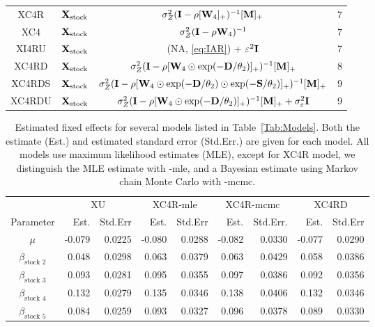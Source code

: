 \documentclass[11pt, titlepage]{article}\usepackage[]{graphicx}\usepackage[]{color}
\begin{document}
\begin{table}[ht]
\begin{center}
\begin{tabular}{c|c|c|c}
  XC4R & $\mathbf{X}_{\textrm{stock}}$ & $\sigma_Z^2(\mathbf{I} - \rho[\mathbf{W}_4]_+)^{-1}[\mathbf{M}]_+$ & 7 \\
  XC4 & $\mathbf{X}_{\textrm{stock}}$ & $\sigma_Z^2(\mathbf{I} - \rho\mathbf{W}_{4})^{-1}$ & 7 \\
  XI4RU & $\mathbf{X}_{\textrm{stock}}$ & (NA, \ref{eq:IAR}) + $\varepsilon^2\mathbf{I}$ & 7 \\
  XC4RD & $\mathbf{X}_{\textrm{stock}}$ & $\sigma_Z^2(\mathbf{I} - \rho[\mathbf{W}_{4}\odot\exp(-\mathbf{D}/\theta_2)]_{+})^{-1}[\mathbf{M}]_+$ & 8 \\
  XC4RDS & $\mathbf{X}_{\textrm{stock}}$ & $\sigma_Z^2(\mathbf{I} - \rho[\mathbf{W}_{4}\odot\exp(-\mathbf{D}/\theta_2)\odot\exp(-\mathbf{S}/\theta_2)]_{+})^{-1}[\mathbf{M}]_+$ & 9 \\
  XC4RDU & $\mathbf{X}_{\textrm{stock}}$ & $\sigma_Z^2(\mathbf{I} - \rho[\mathbf{W}_{4}\odot\exp(-\mathbf{D}/\theta_2)]_{+})^{-1}[\mathbf{M}]_+ + \sigma^2_\varepsilon\mathbf{I}$ & 9 \\
   \hline
\end{tabular}
\end{center}
\end{table}




\newpage
\begin{table}[ht]
				\caption{Estimated fixed effects for several models listed in Table~\ref{Tab:Models}. Both the estimate (Est.) and estimated standard error (Std.Err.) are given for each model. All models use maximum likelihood estimates (MLE), except for XC4R model, we distinguish the MLE estimate with -mle, and a Bayesian estimate using Markov chain Monte Carlo with -mcmc.  \label{Tab:Coeff}}
\begin{center}
\begin{tabular}{c|rr|rr|rr|rr}
  \hline
  \hline
  & \multicolumn{2}{|c|}{XU} & \multicolumn{2}{|c|}{XC4R-mle}  
  & \multicolumn{2}{|c|}{XC4R-mcmc} & \multicolumn{2}{|c}{XC4RD} \\
  Parameter & Est. & Std.Err & Est. & Std.Err & Est. & Std.Err. & Est. & Std.Err \\
  \hline
$\mu$ & -0.079 & 0.0225 & -0.080 & 0.0288 & -0.082 & 0.0330 & -0.077 & 0.0290 \\ 
  $\beta_{\textrm{stock 2}}$ & 0.048 & 0.0298 & 0.063 & 0.0379 & 0.063 & 0.0429 & 0.058 & 0.0386 \\ 
  $\beta_{\textrm{stock 3}}$ & 0.093 & 0.0281 & 0.095 & 0.0355 & 0.097 & 0.0386 & 0.092 & 0.0356 \\ 
  $\beta_{\textrm{stock 4}}$ & 0.132 & 0.0279 & 0.135 & 0.0346 & 0.138 & 0.0406 & 0.132 & 0.0346 \\ 
  $\beta_{\textrm{stock 5}}$ & 0.084 & 0.0259 & 0.093 & 0.0327 & 0.096 & 0.0378 & 0.089 & 0.0330 \\ 
   \hline

\end{tabular}
\end{center}
\end{table}
\end{document}
